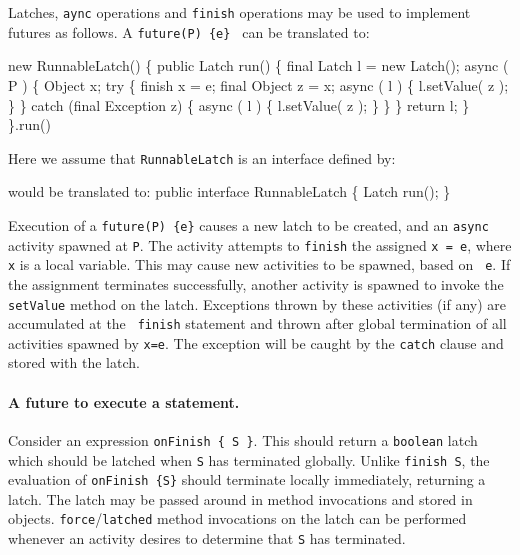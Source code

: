 {{Latches, {\tt aync} operations and {\tt finish} operations may be used to implement futures as follows. A {\tt future(P) \{e\} } can be translated to:
\begin{x10}
  new RunnableLatch() \{
      public Latch run() \{
         final Latch l = new Latch();
         async ( P ) \{
            Object x;
            try \{
                finish x = e;
                final Object z = x;
                async ( l ) \{
                   l.setValue( z ); 
                \}
            \} catch (final Exception z) \{
               async ( l ) \{
                 l.setValue( z );
               \}
            \}
         \}
         return l;
      \}
    \}.run()
\end{x10}

Here we assume that {\tt RunnableLatch} is an interface defined by:
\begin{x10} would be translated to:
  public interface RunnableLatch \{
     Latch run();
  \}
\end{x10}

Execution of a {\tt future(P) \{e\}} causes a new latch to be created,
and an {\tt async} activity spawned at {\tt P}. The activity attempts
to {\tt finish} the assigned {\tt x = e}, where {\tt x} is a local
variable.  This may cause new activities to be spawned, based on {\tt
e}. If the assignment terminates successfully, another activity is
spawned to invoke the {\tt setValue} method on the latch.  Exceptions
thrown by these activities (if any) are accumulated at the {\tt
finish} statement and thrown after global termination of all
activities spawned by {\tt x=e}. The exception will be caught by the 
{\tt catch} clause and stored with the latch. 


\paragraph{A future to execute a statement.}
Consider an expression {\tt onFinish \{ S \}}. This should return
a {\tt boolean} latch which should be latched when {\tt S}
has terminated globally. Unlike {\tt finish S}, the evaluation
of {\tt onFinish  \{S\}} should terminate locally immediately, returning
a latch. The latch may be passed around in method invocations and stored 
in objects. {\tt force}/{\tt latched} method invocations on the latch
can be performed whenever an activity desires to determine 
that {\tt S} has terminated. 

}}
